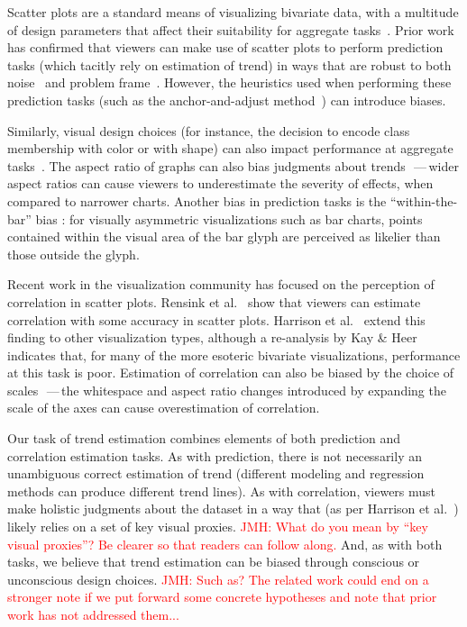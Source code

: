 \documentclass{sigchi}
\newcommand{\jeff}[1]{\textcolor{red}{JMH: #1}}
\begin{document}
Scatter plots are a standard means of visualizing bivariate data, with a multitude of design parameters that affect their suitability for aggregate tasks~\cite{cleveland1984many}. Prior work has confirmed that viewers can make use of scatter plots to perform prediction tasks (which tacitly rely on estimation of trend) in ways that are robust to both noise~\cite{harvey1997effects} and problem frame~\cite{lewandowsky2011popular}. However, the heuristics used when performing these prediction tasks (such as the anchor-and-adjust method~\cite{bolger1993context}) can introduce biases.

Similarly, visual design choices (for instance, the decision to encode class membership with color or with shape) can also impact performance at aggregate tasks~\cite{gleicher2013perception,lewandowsky1989discriminating}. The aspect ratio of graphs can also bias judgments about trends~\cite{beattie2002impact}\,---\,wider aspect ratios can cause viewers to underestimate the severity of effects, when compared to narrower charts. Another bias in prediction tasks is the ``within-the-bar'' bias \cite{newman2012bar}: for visually asymmetric visualizations such as bar charts, points contained within the visual area of the bar glyph are perceived as likelier than those outside the glyph.

Recent work in the visualization community has focused on the perception of correlation in scatter plots. Rensink et al.~\cite{rensink2010perception} show that viewers can estimate correlation with some accuracy in scatter plots. Harrison et al.~\cite{harrison2014ranking} extend this finding to other visualization types, although a re-analysis by Kay \& Heer~\cite{kay2016beyond} indicates that, for many of the more esoteric bivariate visualizations, performance at this task is poor. Estimation of correlation can also be biased by the choice of scales~\cite{cleveland1982variables}\,---\,the whitespace and aspect ratio changes introduced by expanding the scale of the axes can cause overestimation of correlation.

Our task of trend estimation combines elements of both prediction and correlation estimation tasks. As with prediction, there is not necessarily an unambiguous correct estimation of trend (different modeling and regression methods can produce different trend lines). As with correlation, viewers must make holistic judgments about the dataset in a way that (as per Harrison et al.~\cite{harrison2014ranking}) likely relies on a set of key visual proxies. \jeff{What do you mean by ``key visual proxies''? Be clearer so that readers can follow along.} And, as with both tasks, we believe that trend estimation can be biased through conscious or unconscious design choices.
\jeff{Such as? The related work could end on a stronger note if we put forward some concrete hypotheses and note that prior work has not addressed them...}
\end{document}
